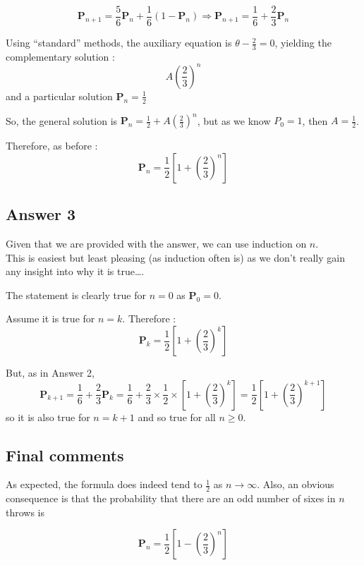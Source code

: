 \begin{equation*} 
\mathbf{P}_{n+1} = \frac{5}{6}\mathbf{P}_{n} + \frac{1}{6}(1-\mathbf{P}_{n})
\Rightarrow \mathbf{P}_{n+1} = \frac{1}{6} + \frac{2}{3}\mathbf{P}_{n}
\end{equation*} 

Using ``standard'' methods, the auxiliary equation is $\theta - \frac{2}{3} = 0$, yielding the complementary solution : 
\begin{equation*} 
A\left(\frac{2}{3}\right)^n
\end{equation*} 
and a particular solution $\mathbf{P}_{n} = \frac{1}{2}$

So, the general solution is $\mathbf{P}_{n} = \frac{1}{2} + A\left(\frac{2}{3}\right)^n$, but as we know $P_0 = 1$, then $A = \frac{1}{2}$.

Therefore, as before :
\begin{equation*} 
\mathbf{P}_n = \frac{1}{2}\left[1 + \left({\frac{2}{3}}\right)^n\right] 
\end{equation*}

\subsection{Answer 3}
Given that we are provided with the answer, we can use induction on $n$. \\
This is easiest but least pleasing (as induction often is) as we don't really gain any insight into why it is true\ldots.

The statement is clearly true for $n = 0$ as  $\mathbf{P}_0 = 0$. 

Assume it is true for $n = k$. Therefore :
\begin{equation*} 
\mathbf{P}_k = \frac{1}{2}\left[1 + \left({\frac{2}{3}}\right)^k\right] 
\end{equation*}

But, as in Answer 2,
\begin{equation*} 
\mathbf{P}_{k+1} = \frac{1}{6} + \frac{2}{3}\mathbf{P}_{k}
= \frac{1}{6} + \frac{2}{3} \times \frac{1}{2} \times \left[1 + \left({\frac{2}{3}}\right)^k\right]
= \frac{1}{2}\left[1 + \left({\frac{2}{3}}\right)^{k+1}\right] 
\end{equation*} 
so it is also true for $n = k+1$ and so true for all $n \geq 0$.

\subsection{Final comments}
As expected, the formula does indeed tend to $\frac{1}{2}$ as $n \rightarrow \infty$. 
Also, an obvious consequence is that the probability that there are an odd number of sixes in $n$ throws is 
 
\begin{equation*} 
\mathbf{P}_n = \frac{1}{2}\left[1 - \left({\frac{2}{3}}\right)^n\right] 
\end{equation*}